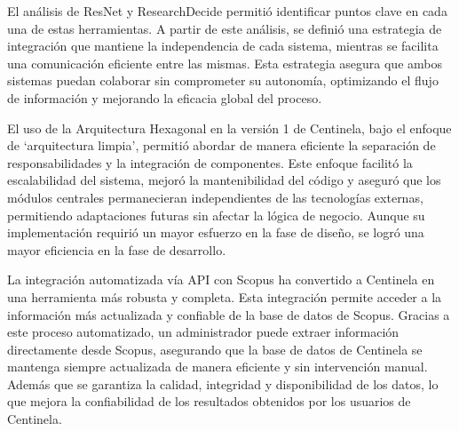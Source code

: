 El análisis de ResNet y ResearchDecide permitió identificar puntos clave en cada una de estas herramientas. 
A partir de este análisis, se definió una estrategia de integración que mantiene la independencia de cada sistema, mientras se facilita una comunicación eficiente entre las mismas. 
Esta estrategia asegura que ambos sistemas puedan colaborar sin comprometer su autonomía, optimizando el flujo de información y mejorando la eficacia global del proceso.



El uso de la Arquitectura Hexagonal en la versión 1 de Centinela, 
bajo el enfoque de `arquitectura limpia', 
permitió abordar de manera eficiente la separación de responsabilidades y la integración de componentes. 
Este enfoque facilitó la escalabilidad del sistema, mejoró la mantenibilidad del código y 
aseguró que los módulos centrales permanecieran independientes de las tecnologías externas,
permitiendo adaptaciones futuras sin afectar la lógica de negocio. 
Aunque su implementación requirió un mayor esfuerzo en la fase de diseño,
se logró una mayor eficiencia en la fase de desarrollo.

La integración automatizada vía API con Scopus ha convertido a Centinela en una herramienta más robusta y completa. Esta integración permite acceder a la información más actualizada y confiable de la base de datos de Scopus. Gracias a este proceso automatizado, un administrador puede extraer información directamente desde Scopus, asegurando que la base de datos de Centinela se mantenga siempre actualizada de manera eficiente y sin intervención manual.
Además que se garantiza la calidad, integridad y disponibilidad de los datos, lo que mejora la confiabilidad de los resultados obtenidos por los usuarios de Centinela.